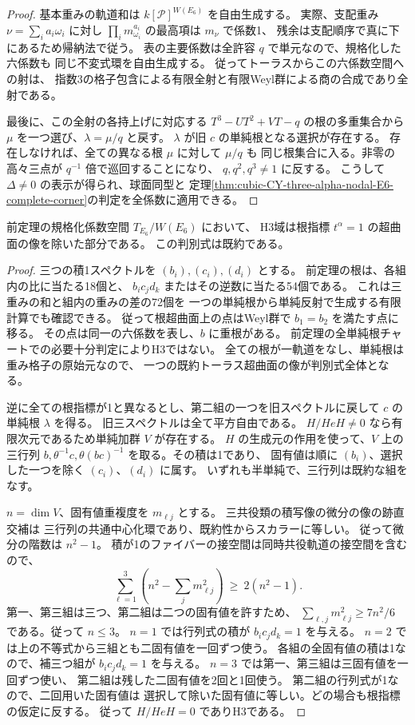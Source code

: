\begin{proof}
基本重みの軌道和は $k[\mathcal P]^{W(E_6)}$ を自由生成する。
実際、支配重み $\nu=\sum_i a_i\omega_i$ に対し
$\prod_i m_{\omega_i}^{a_i}$ の最高項は $m_\nu$ で係数1、
残余は支配順序で真に下にあるため帰納法で従う。
表の主要係数は全許容 $q$ で単元なので、規格化した六係数も
同じ不変式環を自由生成する。
従ってトーラスからこの六係数空間への射は、
指数3の格子包含による有限全射と有限Weyl群による商の合成であり全射である。

最後に、この全射の各持上げに対応する $T^3-UT^2+VT-q$ の根の多重集合から
$\mu$ を一つ選び、$\lambda=\mu/q$ と戻す。
$\lambda$ が旧 $c$ の単純根となる選択が存在する。
存在しなければ、全ての異なる根 $\mu$ に対して $\mu/q$ も
同じ根集合に入る。非零の高々三点が $q^{-1}$ 倍で巡回することになり、
$q,q^2,q^3\ne1$ に反する。
こうして $\Delta\ne0$ の表示が得られ、球面同型と
定理\ref{thm:cubic-CY-three-alpha-nodal-E6-complete-corner}の判定を全係数に適用できる。
\end{proof}

\begin{theorem}
\label{thm:cubic-CY-three-alpha-nodal-E6-root-discriminant}
前定理の規格化係数空間 $T_{E_6}/W(E_6)$ において、
H3域は根指標 $t^\alpha=1$ の超曲面の像を除いた部分である。
この判別式は既約である。
\end{theorem}
\begin{proof}
三つの積1スペクトルを $(b_i),(c_i),(d_i)$ とする。
前定理の根は、各組内の比に当たる18個と、
$b_i c_j d_k$ またはその逆数に当たる54個である。
これは三重みの和と組内の重みの差の72個を
一つの単純根から単純反射で生成する有限計算でも確認できる。
従って根超曲面上の点はWeyl群で $b_1=b_2$ を満たす点に移る。
その点は同一の六係数を表し、$b$ に重根がある。
前定理の全単純根チャートでの必要十分判定によりH3ではない。
全ての根が一軌道をなし、単純根は重み格子の原始元なので、
一つの既約トーラス超曲面の像が判別式全体となる。

逆に全ての根指標が1と異なるとし、第二組の一つを旧スペクトルに戻して
$c$ の単純根 $\lambda$ を得る。
旧三スペクトルは全て平方自由である。
$H/HeH\ne0$ なら有限次元であるため単純加群 $V$ が存在する。
$H$ の生成元の作用を使って、$V$ 上の三行列
$b,\theta^{-1}c,\theta(bc)^{-1}$ を取る。その積は1であり、
固有値は順に $(b_i)$、選択した一つを除く $(c_i)$、$(d_i)$ に属す。
いずれも半単純で、三行列は既約な組をなす。

$n=\dim V$、固有値重複度を $m_{\ell j}$ とする。
三共役類の積写像の微分の像の跡直交補は
三行列の共通中心化環であり、既約性からスカラーに等しい。
従って微分の階数は $n^2-1$。
積が1のファイバーの接空間は同時共役軌道の接空間を含むので、
\[
 \sum_{\ell=1}^3\left(n^2-\sum_j m_{\ell j}^2\right)
 \ \ge\ 2(n^2-1).
\]
第一、第三組は三つ、第二組は二つの固有値を許すため、
$\sum_{\ell,j}m_{\ell j}^2\ge 7n^2/6$ である。従って $n\le3$。
$n=1$ では行列式の積が $b_i c_j d_k=1$ を与える。
$n=2$ では上の不等式から三組とも二固有値を一回ずつ使う。
各組の全固有値の積は1なので、補三つ組が $b_i c_j d_k=1$ を与える。
$n=3$ では第一、第三組は三固有値を一回ずつ使い、
第二組は残した二固有値を2回と1回使う。
第二組の行列式が1なので、二回用いた固有値は
選択して除いた固有値に等しい。どの場合も根指標の仮定に反する。
従って $H/HeH=0$ でありH3である。
\end{proof}

